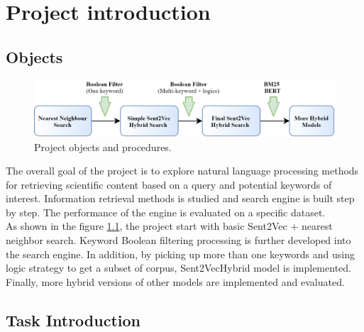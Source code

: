\newcommand{\package}{\emph}

\chapter{Project introduction}

\section{Objects}

\begin{figure}
	\centering
	\includegraphics[width=\linewidth]{figure/Object}
	\caption{Project objects and procedures.}
	\label{fig:object}
\end{figure}

The overall goal of the project is to explore natural language processing methods for retrieving scientific content based on a query and potential keywords of interest. 
Information retrieval methods is studied and search engine is built step by step. The performance of the engine is evaluated on a specific dataset.\\

As shown in the figure \ref{fig:object}, the project start with basic Sent2Vec + nearest neighbor search. 
Keyword Boolean filtering processing is further developed into the search engine. 
In addition, by picking up more than one keywords and using logic strategy to get a subset of corpus, Sent2VecHybrid model is implemented. Finally, more hybrid versions of other models are implemented and evaluated.

\section{Task Introduction}	

